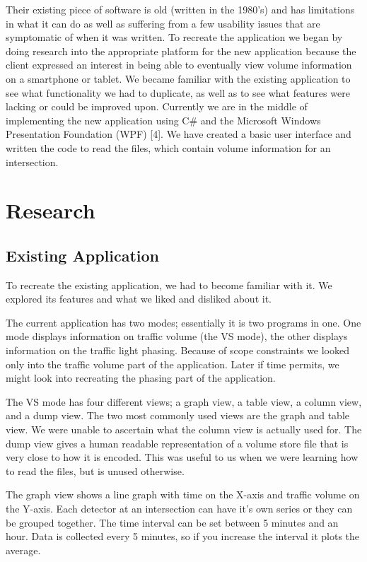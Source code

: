 \documentclass{article}
\begin{document}
Their existing piece of software is old (written in the
1980’s) and has limitations in what it can do as well as
suffering from a few usability issues that are symptomatic of
when it was written.
To recreate the application we began by doing research into
the appropriate platform for the new application because the
client expressed an interest in being able to eventually view
volume information on a smartphone or tablet. We became
familiar with the existing application to see what functionality
we had to duplicate, as well as to see what features were
lacking or could be improved upon.
Currently we are in the middle of implementing the new
application using C\# and the Microsoft Windows Presentation
Foundation (WPF) [4]. We have created a basic user interface
and written the code to read the files, which contain volume
information for an intersection.

\section{Research}
\subsection{Existing Application}
To recreate the existing application, we had to become
familiar with it. We explored its features and what we liked
and disliked about it.

The current application has two modes; essentially it is two
programs in one. One mode displays information on traffic
volume (the VS mode), the other displays information on the
traffic light phasing. Because of scope constraints we looked
only into the traffic volume part of the application. Later if
time permits, we might look into recreating the phasing part of
the application.

The VS mode has four different views; a graph view, a
table view, a column view, and a dump view. The two most
commonly used views are the graph and table view. We were
unable to ascertain what the column view is actually used for.
The dump view gives a human readable representation of a
volume store file that is very close to how it is encoded. This
was useful to us when we were learning how to read the files,
but is unused otherwise.

The graph view shows a line graph with time on the X-axis
and traffic volume on the Y-axis. Each detector at an
intersection can have it’s own series or they can be grouped
together. The time interval can be set between 5 minutes and
an hour. Data is collected every 5 minutes, so if you increase
the interval it plots the average.
\end{document}
